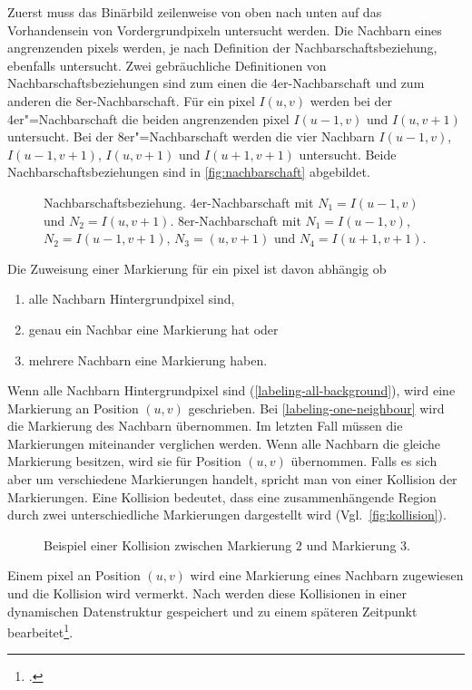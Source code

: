 Zuerst muss das Binärbild zeilenweise von oben nach unten auf das Vorhandensein von Vordergrundpixeln untersucht werden.
Die Nachbarn eines angrenzenden \glspl{pixel} werden, je nach Definition der Nachbarschaftsbeziehung, ebenfalls
 untersucht. Zwei gebräuchliche Definitionen von Nachbarschaftsbeziehungen sind zum einen die 4er-Nachbarschaft und zum
 anderen die 8er-Nachbarschaft. Für ein \gls{pixel} $I(u,v)$ werden bei der 4er"=Nachbarschaft die beiden angrenzenden
 \gls{pixel} $I(u-1,v)$ und $I(u,v+1)$ untersucht. Bei der 8er"=Nachbarschaft werden die vier Nachbarn $I(u-1,v)$,
 $I(u-1,v+1)$, $I(u,v+1)$ und $I(u+1,v+1)$ untersucht. Beide Nachbarschaftsbeziehungen sind in
 \autoref{fig:nachbarschaft} abgebildet.
\begin{figure}[!ht]
	\centering
	\subfigure[]{
		\label{fig:4er-nachbarschaft}
		
	}
	\subfigure[]{
		\label{fig:8er-nachbarschaft}
		
	}
	\caption{Nachbarschaftsbeziehung.  4er-Nachbarschaft mit $N_1 = I(u-1,v)$ und
	 $N_2 = I(u,v+1)$.  8er-Nachbarschaft mit $N_1 = I(u-1,v)$, $N_2 = I(u-1,v+1)$,
	 $N_3 = (u,v+1)$ und $N_4 = I(u+1,v+1)$.}
	\label{fig:nachbarschaft}
\end{figure}
Die Zuweisung einer Markierung für ein \gls{pixel} ist davon abhängig ob
\begin{enumerate}
	\item alle Nachbarn Hintergrundpixel sind, \label{labeling-all-background}
	\item genau ein Nachbar eine Markierung hat oder \label{labeling-one-neighbour}
	\item mehrere Nachbarn eine Markierung haben. \label{labeling-many-neighbours}
\end{enumerate}

Wenn alle Nachbarn Hintergrundpixel sind (\autoref{labeling-all-background}), wird eine Markierung an Position $(u,v)$
 geschrieben. Bei \autoref{labeling-one-neighbour} wird die Markierung des Nachbarn übernommen. Im letzten Fall müssen
 die Markierungen miteinander verglichen werden. Wenn alle Nachbarn die gleiche Markierung besitzen, wird sie für
 Position $(u,v)$ übernommen. Falls es sich aber um verschiedene Markierungen handelt, spricht man von einer Kollision
 der Markierungen. Eine Kollision bedeutet, dass eine zusammenhängende Region durch zwei unterschiedliche
 Markierungen dargestellt wird (Vgl.~\autoref{fig:kollision}).
\begin{figure}[!ht]
	\centering
	
	\caption{Beispiel einer Kollision zwischen Markierung $2$ und Markierung $3$.}
	\label{fig:kollision}
\end{figure}
Einem \gls{pixel} an Position $(u,v)$ wird eine Markierung eines Nachbarn zugewiesen und die Kollision wird vermerkt.
 Nach \citeauthor{burger05} werden diese Kollisionen in einer dynamischen Datenstruktur gespeichert und zu einem
 späteren Zeitpunkt bearbeitet\footcite[Vgl.][S.~203--204]{burger05}.

